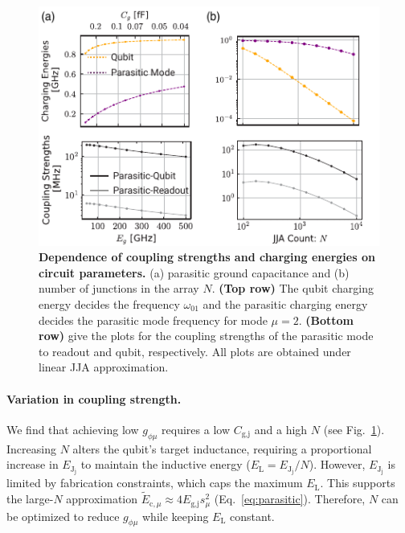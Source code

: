\documentclass[%
reprint,
superscriptaddress,
 amsmath,amssymb,
 aps,
 prx,
longbibliography,
floatfix,
]{revtex4-2}
\begin{document}
\begin{figure}[t]
    \centering
    \includegraphics[width=\linewidth]{Supp_Fig/Circuit_comp.pdf}
    \caption{{\bf Dependence of coupling strengths and charging energies on circuit parameters.} (a) parasitic ground capacitance and (b) number of junctions in the array $N$. {\bf (Top row)} The qubit charging energy decides the frequency $\omega_{01}$ and the parasitic charging energy decides the parasitic mode frequency for mode $\mu=2$. {\bf (Bottom row)} give the plots for the coupling strengths of the parasitic mode to readout and qubit, respectively. All plots are obtained under linear JJA approximation.}
    \label{fig:circuit_comp}
\end{figure}

\paragraph{Variation in coupling strength.}\label{coupling} 
We find that achieving low \( g_{\phi\mu} \) requires a low \( C_\textrm{g,j} \) and a high \( N \) (see Fig.~\ref{fig:circuit_comp}). Increasing \( N \) alters the qubit's target inductance, requiring a proportional increase in \( E_{\textrm{J}_\textrm{j}} \) to maintain the inductive energy (\( E_\textrm{L} = E_{\textrm{J}_\textrm{j}}/N \)). However, \( E_{\textrm{J}_\textrm{j}} \) is limited by fabrication constraints, which caps the maximum \( E_\textrm{L} \). This supports the large-\( N \) approximation \( \tilde{E}_{\textrm{c},\mu} \approx 4E_\textrm{g,j}s_\mu^2 \) (Eq.~\ref{eq:parasitic}). Therefore, \( N \) can be optimized to reduce \( g_{\phi\mu} \) while keeping \( E_\textrm{L} \) constant.
\end{document}
